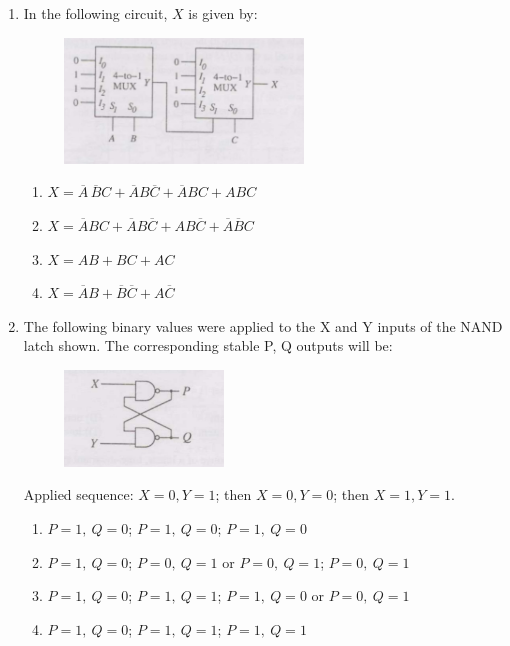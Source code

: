 \documentclass[journal,12pt,onecolumn]{IEEEtran}
\theoremstyle{remark}
\begin{document}
\begin{enumerate}
\item In the following circuit, $X$ is given by: 

\begin{figure}[ht!]
    \centering
    \includegraphics[width=0.6\textwidth]{Q43.jpg}
    \caption{}
    \label{fig:Q43.jpg}
\end{figure}

\hfill{}
\begin{enumerate}
  \item $X = \overline{A} \,\overline{B} C + \overline{A} B \overline{C} + \overline{A} B C + A B C$
  \item $X = \overline{A} B C + \overline{A} B \overline{C} + A B \overline{C} + \overline{A} \overline{B} C$
  \item $X = A B + B C + A C$
  \item $X = \overline{A} B + \overline{B} \overline{C} + A \overline{C}$
\end{enumerate}

\item The following binary values were applied to the X and Y inputs of the NAND latch shown. The corresponding stable P, Q outputs will be: 

\begin{figure}[ht!]
    \centering
    \includegraphics[width=0.4\textwidth]{Q44.jpg}
    \caption{}
    \label{fig:Q44.jpg}
\end{figure}

 Applied sequence: $X=0,Y=1$; then $X=0,Y=0$; then $X=1,Y=1$.
\hfill{}
\begin{enumerate}
  \item $P=1,\ Q=0$; \quad $P=1,\ Q=0$; \quad $P=1,\ Q=0$
  \item $P=1,\ Q=0$; \quad $P=0,\ Q=1$ or $P=0,\ Q=1$; \quad $P=0,\ Q=1$
  \item $P=1,\ Q=0$; \quad $P=1,\ Q=1$; \quad $P=1,\ Q=0$ or $P=0,\ Q=1$
  \item $P=1,\ Q=0$; \quad $P=1,\ Q=1$; \quad $P=1,\ Q=1$
\end{enumerate}


\end{enumerate}
\end{document}

